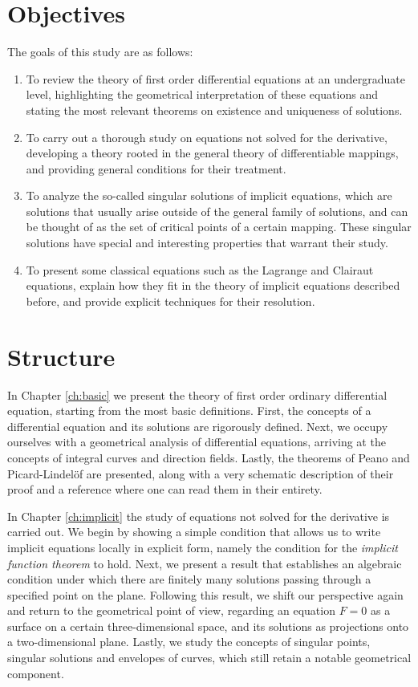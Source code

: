 \section{Objectives}

The goals of this study are as follows:

\begin{enumerate}[1.]
  \item To review the theory of first order differential equations at an undergraduate level, highlighting the geometrical interpretation of these equations and stating the most relevant theorems on existence and uniqueness of solutions.
  \item To carry out a thorough study on equations not solved for the derivative, developing a theory rooted in the general theory of differentiable mappings, and providing general conditions for their treatment.
  \item To analyze the so-called singular solutions of implicit equations, which are solutions that usually arise outside of the general family of solutions, and can be thought of as the set of critical points of a certain mapping. These singular solutions have special and interesting properties that warrant their study.
  \item To present some classical equations such as the Lagrange and Clairaut equations, explain how they fit in the theory of implicit equations described before, and provide explicit techniques for their resolution.
\end{enumerate}

\section{Structure}

In Chapter \ref{ch:basic} we present the theory of first order ordinary differential equation, starting from the most basic definitions. First, the concepts of a differential equation and its solutions are rigorously defined. Next, we occupy ourselves with a geometrical analysis of differential equations, arriving at the concepts of integral curves and direction fields. Lastly, the theorems of Peano and Picard-Lindelöf are presented, along with a very schematic description of their proof and a reference where one can read them in their entirety.

In Chapter \ref{ch:implicit} the study of equations not solved for the derivative is carried out. We begin by showing a simple condition that allows us to write implicit equations locally in explicit form, namely the condition for the \textit{implicit function theorem} to hold. Next, we present a result that establishes an algebraic condition under which there are finitely many solutions passing through a specified point on the plane. Following this result, we shift our perspective again and return to the geometrical point of view, regarding an equation $F=0$ as a surface on a certain three-dimensional space, and its solutions as projections onto a two-dimensional plane. Lastly, we study the concepts of singular points, singular solutions and envelopes of curves, which still retain a notable geometrical component.

